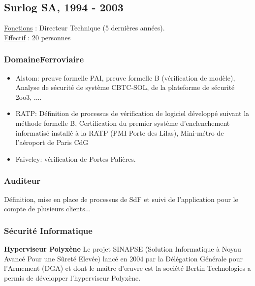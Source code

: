\documentclass[a4paper,12pt]{article}
\begin{document}
\subsection{Surlog SA, 1994 - 2003}
\hspace{-0.6cm}\underline{Fonctions} : Directeur Technique (5 derni\`eres ann\'ees).
\\
\underline{Effectif} : 20 personnes
\\
\subsubsection{DomaineFerroviaire}
\begin{itemize}
\item Alstom: preuve formelle PAI, preuve formelle B (v\'erification
  de mod\`ele), Analyse de s\'ecurit\'e de syst\`eme CBTC-SOL, de la
  plateforme de s\'ecurit\'e 2oo3, .... 
\item RATP: D\'efinition de processus de v\'erification de logiciel
  d\'evelopp\'e suivant la m\'ethode formelle B, Certification du
  premier syst\`eme d'enclenchement informatis\'e  install\'e \`a  la RATP (PMI Porte des Lilas),
  Mini-m\'etro de l'a\'eroport de Paris CdG 
\item Faiveley: v\'erification de Portes Pali\`eres.  
\end{itemize}


\subsubsection {Auditeur}
D\'efinition, mise en place de processus de SdF et suivi de
l'application pour le compte de plusieurs clients... 

\subsubsection{S\'ecurit\'e Informatique}
\textbf{Hyperviseur Polyx\`ene}
Le projet SINAPSE (Solution Informatique \`a Noyau Avanc\'e Pour une S\^uret\'e Elev\'ee) 
lanc\'e en 2004 par la D\'el\'egation G\'en\'erale pour l'Armement (DGA) et 
dont le ma\^itre d'\oe{}uvre est la soci\'et\'e Bertin Technologies a permis de d\'evelopper l'hyperviseur Polyx\`ene.
\end{document}

